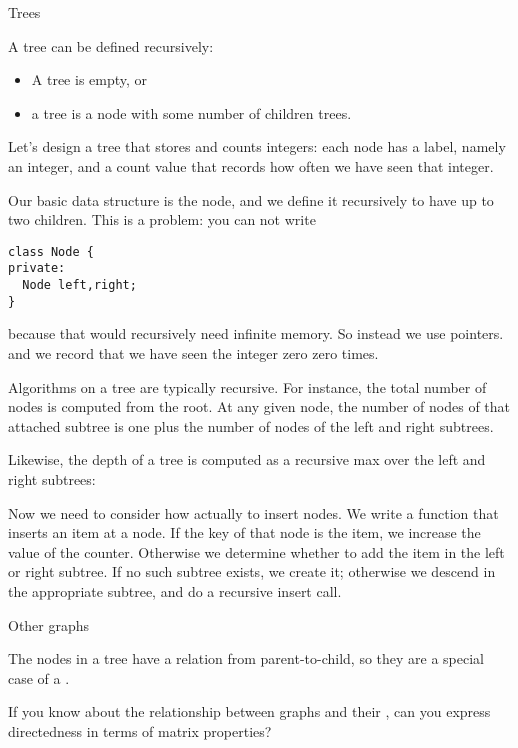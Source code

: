  {Trees}

A tree can be defined recursively:
\begin{itemize}
\item A tree is empty, or
\item a tree is a node with some number of children trees.
\end{itemize}
Let's design a tree that stores and counts integers: each node has a
label, namely an integer, and a count value that records how often we
have seen that integer.

Our basic data structure is the node, and we define it recursively to
have up to two children. This is a problem: you can not write
\begin{lstlisting}
class Node {
private:
  Node left,right;
}
\end{lstlisting}
because that would recursively need infinite memory. So instead we use pointers.
%
%
and we record that we have seen the integer zero zero times.

Algorithms on a tree are typically recursive. For instance, the total
number of nodes is computed from the root. At any given node, the
number of nodes of that attached subtree is one plus the number of
nodes of the left and right subtrees.
%

Likewise, the depth of a tree is computed as a recursive max over the
left and right subtrees:
%

Now we need to consider how actually to insert nodes. We write a
function that inserts an item at a node. If the key of that node is
the item, we increase the value of the counter. Otherwise we determine
whether to add the item in the left or right subtree. If no such
subtree exists, we create it; otherwise we descend in the appropriate
subtree, and do a recursive insert call.
%


 {Other graphs}

The nodes in a tree have a relation from parent-to-child, so
they are a special case of a .

\begin{exercise}
  If you know about the relationship between graphs and their
  ,
  can you express directedness in terms of matrix properties?
\end{exercise}


